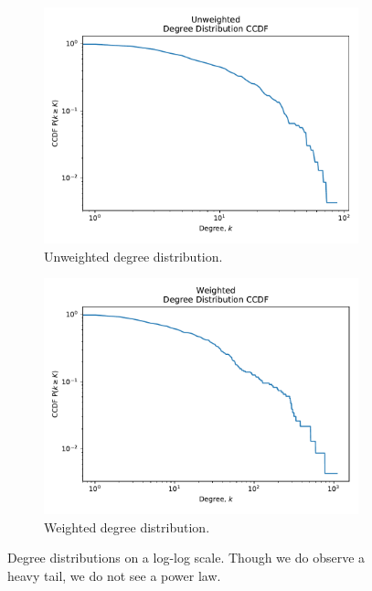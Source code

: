 \begin{figure}[ht]
    \centering
    \begin{subfigure}{0.4\textwidth}
        \includegraphics[width=1.\textwidth]{images/unweighted_degree_distr_ccdf.pdf}
        \caption{Unweighted degree distribution.}
    \end{subfigure}
    \begin{subfigure}{0.4\textwidth}
        \includegraphics[width=1.\textwidth]{images/weighted_degree_distr_ccdf.pdf}
        \caption{Weighted degree distribution.}
    \end{subfigure}
    \caption{Degree distributions on a log-log scale. Though we do observe a heavy tail, we do not see a power law.}
    \label{fig:degree_distr}
\end{figure}


